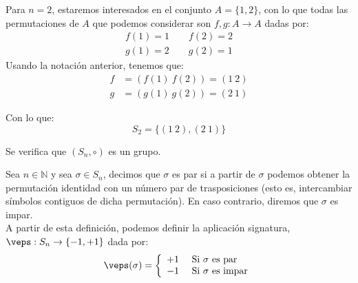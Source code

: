 \begin{ejemplo}
    Para $n=2$, estaremos interesados en el conjunto $A=\{1,2\}$, con lo que todas las permutaciones de $A$ que podemos considerar son $f,g:A\rightarrow A$ dadas por:
    \begin{gather*}
        f(1) = 1 \qquad f(2) = 2 \\
        g(1) = 2 \qquad g(2) = 1
    \end{gather*}
    Usando la notación anterior, tenemos que:
    \begin{align*}
        f &= (f(1)\ f(2)) = (1\ 2) \\
        g &= (g(1)\ g(2)) = (2\ 1)
    \end{align*}

    Con lo que:
    \begin{equation*}
        S_2 = \{(1\ 2),(2\ 1)\}
    \end{equation*}
\end{ejemplo}

\begin{prop}
    Se verifica que $(S_n,\circ)$ es un grupo.
\end{prop}

\begin{definicion}[Signatura]
    Sea $n\in \mathbb{N}$ y sea $\sigma\in S_n$, decimos que $\sigma$ es par si a partir de $\sigma$ podemos obtener la permutación identidad con un número par de trasposiciones (esto es, intercambiar símbolos contiguos de dicha permutación). En caso contrario, diremos que $\sigma$ es impar.\\

    \noindent
    A partir de esta definición, podemos definir la aplicación signatura, ${\veps:S_n\rightarrow\{-1,+1\}}$ dada por:
    \begin{equation*}
        \veps(\sigma) = \left\{\begin{array}{rl}
                +1 & \text{\ Si\ } \sigma \text{\ es par} \\
                -1 & \text{\ Si\ } \sigma \text{\ es impar} \\
        \end{array}\right.
    \end{equation*}
\end{definicion}

